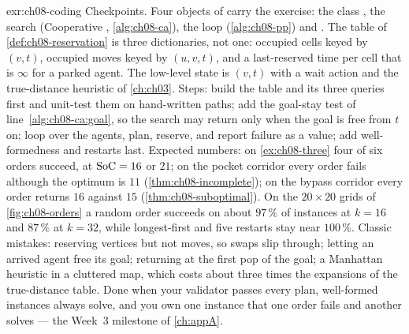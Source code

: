 
\begin{solution}{exr:ch08-coding}
Checkpoints. Four objects of  carry the exercise: the class
, the search  (Cooperative \astar,
\cref{alg:ch08-ca}), the loop  (\cref{alg:ch08-pp}) and
. The table of \cref{def:ch08-reservation} is three dictionaries, not one:
occupied cells keyed by $(v,t)$, occupied moves keyed by $(u,v,t)$, and a last-reserved
time per cell that is $\infty$ for a parked agent. The low-level state is $(v,t)$ with a
wait action and the true-distance heuristic of \cref{ch:ch03}. Steps: build the table and
its three queries first and unit-test them on hand-written paths; add the goal-stay test
of line~\ref{alg:ch08-ca:goal}, so the search may return only when the goal is free from
$t$ on; loop over the agents, plan, reserve, and report failure as a value; add
well-formedness and restarts last. Expected numbers: on \cref{ex:ch08-three} four of six
orders succeed, at $\mathrm{SoC}=16$ or $21$; on the pocket corridor every order fails
although the optimum is $11$ (\cref{thm:ch08-incomplete}); on the bypass corridor every
order returns $16$ against $15$ (\cref{thm:ch08-suboptimal}). On the $20\times20$ grids of
\cref{fig:ch08-orders} a random order succeeds on about $97\,\%$ of instances at $k=16$
and $87\,\%$ at $k=32$, while longest-first and five restarts stay near $100\,\%$. Classic
mistakes: reserving vertices but not moves, so swaps slip through; letting an arrived
agent free its goal; returning at the first pop of the goal; a Manhattan heuristic in a
cluttered map, which costs about three times the expansions of the true-distance table.
Done when your validator passes every plan, well-formed instances always solve, and you
own one instance that one order fails and another solves --- the Week~3 milestone of
\cref{ch:appA}.
\end{solution}
